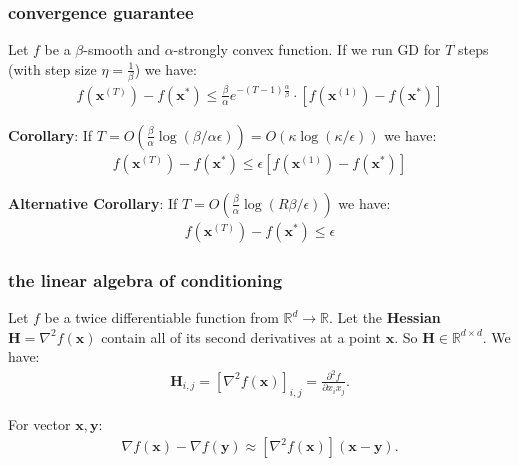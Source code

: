 \documentclass[compress]{beamer}
\newcommand{\bv}[1]{\mathbf{#1}}
\newcommand{\R}{\mathbb{R}}
\begin{document}
\begin{frame}[t]
	\frametitle{convergence guarantee}
	\begin{corollary}
		Let $f$ be a $\beta$-smooth and $\alpha$-strongly convex function. If we run GD for $T$ steps (with step size $\eta = \frac{1}{\beta}$) we have:
		\begin{align*}
			f(\bv{x}^{(T)}) - f(\bv{x}^*)  \leq \frac{\beta}{\alpha} e^{-(T-1)\frac{\alpha}{\beta}} \cdot  \left[f(\bv{x}^{(1)}) - f(\bv{x}^*)\right]
		\end{align*} 
	\end{corollary}	
	
	\textbf{Corollary}: 
	If \alert{$T = O\left(\frac{\beta}{\alpha}\log(\beta/\alpha \epsilon)\right) =  O(\kappa\log(\kappa/\epsilon))$ } we have:
	\begin{align*}
		f({\bv{x}}^{(T)}) - f(\bv{x}^*) \leq \epsilon \left[f(\bv{x}^{(1)}) - f(\bv{x}^*)\right]
	\end{align*}

	\textbf{Alternative Corollary}: 
	If \alert{$T = O\left(\frac{\beta}{\alpha}\log(R\beta/\epsilon)\right)$} we have:
	\begin{align*}
		f({\bv{x}}^{(T)}) - f(\bv{x}^*) \leq \epsilon
	\end{align*}
	
\end{frame}

\begin{frame}[t]
	\frametitle{the linear algebra of conditioning}
	Let $f$ be a twice differentiable function from $\R^d \rightarrow \R$. Let the \textbf{\alert{Hessian}} $\bv{H} = \nabla^2 f(\bv{x})$ contain all of its second derivatives at a point $\bv{x}$. So $\bv{H}\in \R^{d\times d}$.  We have:
	\begin{align*}
		\bv{H}_{i,j} = \left[\nabla^2 f(\bv{x})\right]_{i,j} = \frac{\partial^2 f}{\partial x_i x_j}. 
	\end{align*}
	
	For vector $\bv{x}, \bv{y}$:
	\begin{align*}
		\nabla f(\bv{x}) - \nabla f(\bv{y}) \approx \left[\nabla^2 f(\bv{x})\right](\bv{x}-\bv{y}).
	\end{align*}
\end{frame}
\end{document}
